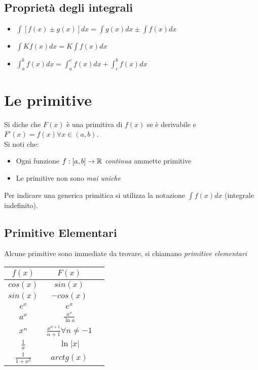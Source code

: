 \subsection{Proprietà degli integrali}
\begin{itemize}
	\item $\int[f(x) \pm g(x)] dx = \int g(x) dx \pm \int f(x) dx$
	\item $\int K f(x) dx = K\int f(x) dx$
	\item $\int_{a}^{b} f(x) dx = \int_{a}^{c} f(x) dx + \int_{c}^{b} f(x) dx$
\end{itemize}

\section{Le primitive}
Si diche che $F(x)$ è una primitiva di $f(x)$ se è derivabile e $F'(x) = f(x) \forall x\in (a,b)$.
\\Si noti che:
\begin{itemize}
	\item Ogni funzione $f:[a,b] \to \mathbb{R}$ \emph{continua} ammette primitive
	\item Le primitive non sono \emph{mai uniche}
\end{itemize}
Per indicare una generica primitica si utilizza la notazione $\int f(x) dx$ (integrale indefinito).

\subsection{Primitive Elementari}
Alcune primitive sono immediate da trovare, si chiamano \emph{primitive elementari}\\
\begin{tabular}{ |c|c|c| }
	\hline
	$f(x)$            & $F(x)$                                  \\
	\hline
	$cos(x)$          & $sin(x)$                                \\
	\hline
	$sin(x)$          & $-cos(x)$                               \\
	\hline
	$e^x$             & $e^x$                                   \\
	\hline
	$a^x$             & $\frac{a^x}{\ln a} $                    \\
	\hline
	$x^n$             & $\frac{x^{n+1}}{n+1} \forall n\neq -1 $ \\
	\hline
	$\frac{1}{x}$     & $\ln |x| $                              \\
	\hline
	$\frac{1}{1+x^2}$ & $arctg(x) $                             \\
	\hline
\end{tabular}


